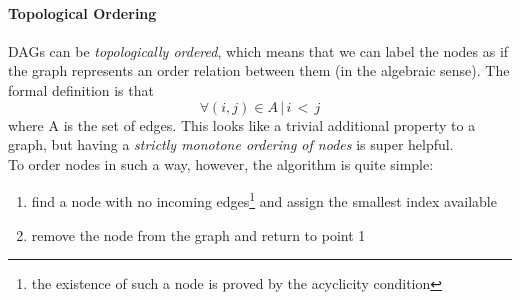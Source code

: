             \paragraph{Topological Ordering}
                DAGs can be \textit{topologically ordered}, which means that we can label the nodes as if the graph represents an order relation between them (in the algebraic sense). The formal definition is that
                \begin{equation}
                    \forall (i, j) \in A\, |\, i\, <\, j
                \end{equation}
                where A is the set of edges. This looks like a trivial additional property to a graph, but having a \textit{strictly monotone ordering of nodes} is super helpful.\\
                To order nodes in such a way, however, the algorithm is quite simple:
                \begin{enumerate}
                    \item find a node with no incoming edges\footnote{the existence of such a node is proved by the acyclicity condition} and assign the smallest index available
                    \item remove the node from the graph and return to point 1
                \end{enumerate}
            
